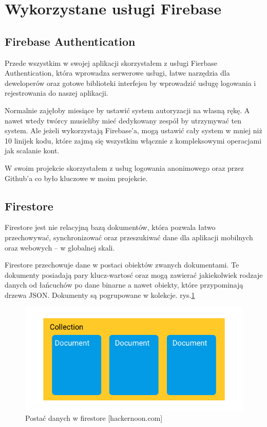 \section{Wykorzystane usługi Firebase}

\subsection{Firebase Authentication}

Przede wszystkim w swojej aplikacji skorzystałem z usługi Fierbase Authentication, która wprowadza serwerowe usługi, łatwe narzędzia dla deweloperów oraz gotowe biblioteki interfejsu by wprowadzić usługę logowania i rejestrowania do naszej aplikacji.

Normalnie zajęłoby miesiące by ustawić system autoryzacji na własną rękę. A nawet wtedy twórcy musieliby mieć dedykowany zespół by utrzymywać ten system. Ale jeżeli wykorzystają Firebase’a, mogą ustawić cały system w mniej niż 10 linijek kodu, które zajmą się wszystkim włącznie z kompleksowymi operacjami jak scalanie kont.

W swoim projekcie skorzystałem z usług logowania anonimowego oraz przez Github’a co było kluczowe w moim projekcie.

\subsection{Firestore}

Firestore jest nie relacyjną bazą dokumentów, która pozwala łatwo przechowywać, synchronizować oraz przeszukiwać dane dla aplikacji mobilnych oraz webowych – w globalnej skali.

Firestore przechowuje dane w postaci obiektów zwanych dokumentami. Te dokumenty posiadają pary klucz-wartosć oraz mogą zawierać jakiekolwiek rodzaje danych od łańcuchów po dane binarne a nawet obiekty, które przypominają drzewa JSON. Dokumenty są pogrupowane w kolekcje. rys.\ref{rys:firestoreData}

\begin{figure}
	\centering\includegraphics[width=.6\textwidth]{img/firestoreData}
	\caption{Postać danych w firestore [hackernoon.com]}\label{rys:firestoreData}%
\end{figure}


